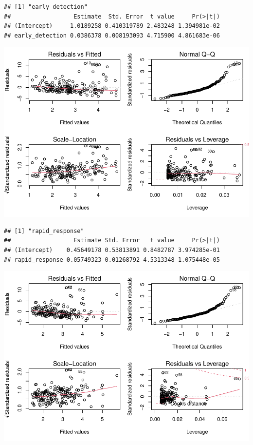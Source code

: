 \documentclass[
]{article}
\begin{document}
\begin{verbatim}
## [1] "early_detection"
##                  Estimate  Std. Error  t value     Pr(>|t|)
## (Intercept)     1.0189258 0.410319789 2.483248 1.394981e-02
## early_detection 0.0386378 0.008193093 4.715900 4.861683e-06
\end{verbatim}

\includegraphics{Basic-Regression_files/figure-latex/unnamed-chunk-6-2.pdf}

\begin{verbatim}
## [1] "rapid_response"
##                  Estimate Std. Error   t value     Pr(>|t|)
## (Intercept)    0.45649178 0.53813891 0.8482787 3.974285e-01
## rapid_response 0.05749323 0.01268792 4.5313348 1.075448e-05
\end{verbatim}

\includegraphics{Basic-Regression_files/figure-latex/unnamed-chunk-6-3.pdf}
\end{document}
